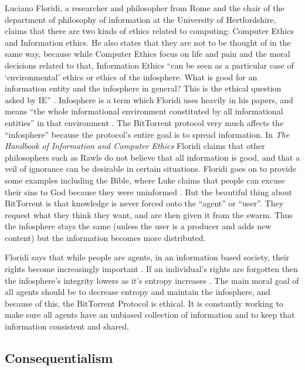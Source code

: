 \documentclass[11pt]{article}
\begin{document}
Luciano Floridi, a researcher and philosopher from Rome and the chair of the department of philosophy of information at the University of Hertfordshire, claims that there are two kinds of ethics related to computing: Computer Ethics and Information ethics. He also states that they are not to be thought of in the same way, because while Computer Ethics focus on life and pain and the moral decisions related to that, Information Ethics ``can be seen as a particular case of `environmental' ethics or ethics of the infosphere. What is good for an information entity and the infosphere in general? This is the ethical question asked by IE'' \cite[1]{floridiInfo}. Infosphere is a term which Floridi uses heavily in his papers, and means ``the whole informational environment constituted by all informational entities'' in that environment \cite[3]{ethicshandbook}. The BitTorrent protocol very much affects the ``infosphere'' because the protocol's entire goal is to spread information. In \textit{The Handbook of Information and Computer Ethics} Floridi claims that other philosophers such as Rawls do not believe that all information is good, and that a veil of ignorance can be desirable in certain situations. Floridi goes on to provide some examples including the Bible, where Luke claims that people can excuse their sins to God because they were uninformed \cite[6]{ethicshandbook}. But the beautiful thing about BitTorrent is that knowledge is never forced onto the ``agent'' or ``user''. They request what they think they want, and are then given it from the swarm. Thus the infosphere stays the same (unless the user is a producer and adds new content) but the information becomes more distributed.

Floridi says that while people are agents, in an information based society, their rights become increasingly important \cite[4]{floridiInfo}. If an individual's rights are forgotten then the infosphere's integrity lowers as it's entropy increases \cite[10]{floridiInfo}. The main moral goal of all agents should be to decrease entropy and maintain the infosphere, and because of this, the BitTorrent Protocol is ethical. It is constantly working to make sure all agents have an unbiased collection of information and to keep that information consistent and shared.

\subsection{Consequentialism}
\end{document}
